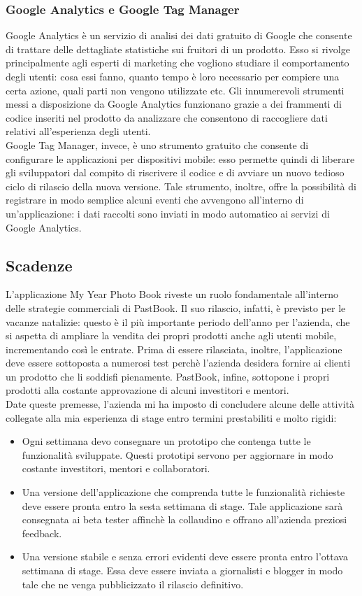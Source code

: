			\subsubsection{Google Analytics e Google Tag Manager}
				Google Analytics è un servizio di analisi dei dati gratuito di Google che consente di trattare delle dettagliate
				statistiche sui fruitori di un prodotto. Esso si rivolge principalmente agli esperti di marketing che vogliono
				studiare il comportamento degli utenti: cosa essi fanno, quanto tempo è loro necessario per compiere una certa
				azione, quali parti non vengono utilizzate etc. Gli innumerevoli strumenti messi a disposizione da Google Analytics
				funzionano grazie a dei frammenti di codice inseriti nel prodotto da analizzare che consentono di raccogliere dati
				relativi all'esperienza degli utenti.\\
				Google Tag Manager, invece, è uno strumento gratuito che consente di configurare le applicazioni per dispositivi
				mobile: esso permette quindi di liberare gli sviluppatori dal compito di riscrivere il codice e di avviare un nuovo
				tedioso ciclo di rilascio della nuova versione. Tale strumento, inoltre, offre la possibilità di registrare in modo
				semplice alcuni eventi che avvengono all'interno di un'applicazione: i dati raccolti sono inviati in modo
				automatico ai servizi di Google Analytics.
		\subsection{Scadenze}
			L'applicazione My Year Photo Book riveste un ruolo fondamentale all'interno delle strategie commerciali di PastBook. Il suo
			rilascio, infatti, è previsto per le vacanze natalizie: questo è il più importante periodo dell'anno per l'azienda, che si
			aspetta di ampliare la vendita dei propri prodotti anche agli utenti mobile, incrementando così le entrate. Prima di essere
			rilasciata, inoltre, l'applicazione deve essere sottoposta a numerosi test perchè l'azienda desidera fornire ai clienti un
			prodotto che li soddisfi pienamente. PastBook, infine, sottopone i propri prodotti alla costante approvazione di alcuni
			investitori e mentori.\\
			Date queste premesse, l'azienda mi ha imposto di concludere alcune delle attività collegate alla mia esperienza di stage
			entro termini prestabiliti e molto rigidi:
			\begin{itemize}
				\item Ogni settimana devo consegnare un prototipo che contenga tutte le funzionalità sviluppate. Questi prototipi
				servono per aggiornare in modo costante investitori, mentori e collaboratori.
				\item Una versione dell'applicazione che comprenda tutte le funzionalità richieste deve essere pronta entro
				la sesta settimana di stage. Tale applicazione sarà consegnata ai beta tester affinchè la collaudino e offrano
				all'azienda preziosi feedback.
				\item Una versione stabile e senza errori evidenti deve essere pronta entro l'ottava settimana di stage. Essa deve
				essere inviata a giornalisti e blogger in modo tale che ne venga pubblicizzato il rilascio definitivo.
			\end{itemize}

